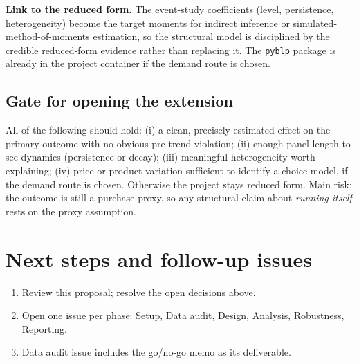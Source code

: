 \documentclass[11pt]{article}
\begin{document}
\medskip
\noindent\textbf{Link to the reduced form.} The event-study coefficients (level, persistence, heterogeneity) become
the target moments for indirect inference or simulated-method-of-moments estimation, so the structural model is
disciplined by the credible reduced-form evidence rather than replacing it. The \texttt{pyblp} package is already in the
project container if the demand route is chosen.

\subsection*{Gate for opening the extension}
All of the following should hold: (i) a clean, precisely estimated effect on the primary outcome with
no obvious pre-trend violation; (ii) enough panel length to see dynamics (persistence or decay);
(iii) meaningful heterogeneity worth explaining; (iv) price or product variation sufficient to identify
a choice model, if the demand route is chosen. Otherwise the project stays reduced form. Main risk: the outcome
is still a purchase proxy, so any structural claim about \emph{running itself} rests on the proxy assumption.

\section{Next steps and follow-up issues}
\begin{enumerate}
  \item Review this proposal; resolve the open decisions above.
  \item Open one issue per phase: Setup, Data audit, Design, Analysis, Robustness, Reporting.
  \item Data audit issue includes the go/no-go memo as its deliverable.
\end{enumerate}
\end{document}
